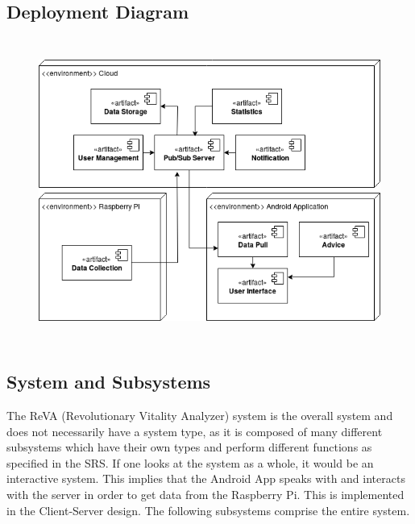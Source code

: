 \subsection{Deployment Diagram}
\begin{center}
\begin{figure}[h]
	\includegraphics[width=15cm, height=10cm]{OverallDescription/DeploymentDiagram.png}
\end{figure}
\end{center}

\subsection{System and Subsystems}
	The ReVA (Revolutionary Vitality Analyzer) system is the overall system and does not necessarily have a system type, as it is composed of many different subsystems which have their own types and perform different functions as specified in the SRS. If one looks at the system as a whole, it would be an interactive system. This implies that the Android App speaks with and interacts with the server in order to get data from the Raspberry Pi. This is implemented in the Client-Server design. The following subsystems comprise the entire system.

